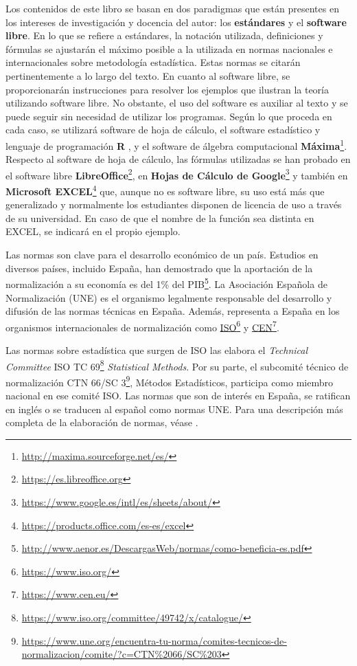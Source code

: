 \documentclass[
]{book}
\theoremstyle{definition}
\theoremstyle{definition}
\theoremstyle{definition}
\theoremstyle{definition}
\theoremstyle{remark}
\begin{document}
Los contenidos de este libro se basan en dos paradigmas que están presentes
en los intereses de investigación y docencia del autor: los \textbf{estándares} y
el \textbf{software libre}. En lo que se refiere a estándares, la notación utilizada,
definiciones y fórmulas se ajustarán el máximo posible a la utilizada en normas
nacionales e internacionales sobre metodología estadística. Estas normas se
citarán pertinentemente a lo largo del texto. En cuanto al software libre,
se proporcionarán instrucciones para resolver los ejemplos
que ilustran la teoría utilizando software libre.
No obstante, el uso del software es
auxiliar al texto y se puede seguir sin necesidad de utilizar
los programas. Según lo que proceda en cada caso, se utilizará
software de hoja de cálculo, el software estadístico y lenguaje de
programación
\textbf{R} \citep{R-base},
y el software de álgebra computacional \textbf{Máxima}\footnote{\url{http://maxima.sourceforge.net/es/}}.
Respecto al software de hoja de cálculo, las fórmulas utilizadas se han probado
en el software libre \textbf{LibreOffice}\footnote{\url{https://es.libreoffice.org}}, en \textbf{Hojas de Cálculo de Google}\footnote{\url{https://www.google.es/intl/es/sheets/about/}} y
también en \textbf{Microsoft EXCEL}\footnote{\url{https://products.office.com/es-es/excel}} que,
aunque no es software libre, su uso
está más que generalizado y normalmente los estudiantes disponen de licencia de uso
a través de su universidad. En caso de que el nombre de la función sea distinta
en EXCEL, se indicará en el propio ejemplo.

Las normas son clave para el desarrollo económico de un país. Estudios en diversos países,
incluido España, han demostrado que la aportación de la normalización a su economía es del 1\% del PIB\footnote{\url{http://www.aenor.es/DescargasWeb/normas/como-beneficia-es.pdf}}. La
Asociación Española de Normalización (UNE) es el organismo legalmente
responsable del desarrollo y difusión de las normas técnicas en España.
Además, representa a España en los organismos internacionales de normalización como
\href{https://www.iso.org/}{ISO}\footnote{\url{https://www.iso.org/}} y \href{https://www.cen.eu/}{CEN}\footnote{\url{https://www.cen.eu/}}.

Las normas sobre estadística que surgen de ISO las elabora el \emph{Technical Committee}
ISO TC 69\footnote{\url{https://www.iso.org/committee/49742/x/catalogue/}} \emph{Statistical Methods}.
Por su parte, el subcomité técnico de normalización
CTN 66/SC 3\footnote{\url{https://www.une.org/encuentra-tu-norma/comites-tecnicos-de-normalizacion/comite/?c=CTN\%2066/SC\%203}}, Métodos Estadísticos,
participa como miembro nacional en ese comité ISO.
Las normas que son de interés en España, se ratifican en inglés o se traducen
al español como normas UNE. Para una descripción más completa de la elaboración
de normas, véase \citet{cano2015qcr}.
\end{document}

